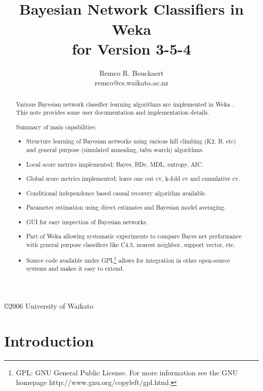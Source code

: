 \documentclass[a4paper]{article}
\title{\epsfig{file=images/coat_of_arms.eps,width=10cm}\vspace{3cm}\\Bayesian Network Classifiers in Weka\\for Version 3-5-4}
\author{Remco R. Bouckaert\\remco@cs.waikato.ac.nz}
\begin{document}
\begin{titlepage}

\maketitle
\thispagestyle{empty}

\center
\vspace{8cm}

\copyright 2006 University of Waikato

\end{titlepage}

\begin{abstract}
Various Bayesian network classifier learning algorithms are implemented in Weka \cite{weka}.
This note provides some user documentation and implementation details.

Summary of main capabilities:
\begin{itemize}
  \item Structure learning of Bayesian networks using various hill climbing (K2, B, etc) and
general purpose (simulated annealing, tabu search) algorithms.
  \item Local score metrics implemented; Bayes, BDe, MDL, entropy, AIC.
  \item Global score metrics implemented; leave one out cv, k-fold cv and cumulative cv.
  \item Conditional independence based causal recovery algorithm available.
  \item Parameter estimation using direct estimates and Bayesian model averaging.
  \item GUI for easy inspection of Bayesian networks.
  \item Part of Weka allowing systematic experiments to compare Bayes net performance with general 
purpose classifiers like C4.5, nearest neighbor, support vector, etc.
  \item Source code available under GPL\footnote{GPL: GNU General Public License. For more information see the GNU homepage http://www.gnu.org/copyleft/gpl.html.} allows for integration in other open-source systems and makes it easy to extend.
\end{itemize}
\end{abstract}
\newpage

\tableofcontents
\newpage

\section{Introduction}
\end{document}
